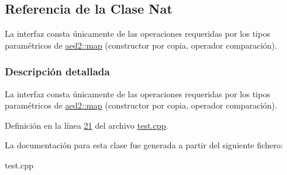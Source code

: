 \hypertarget{classNat}{\subsection{Referencia de la Clase Nat}
\label{classNat}
}


La interfaz consta únicamente de las operaciones requeridas por los tipos paramétricos de \hyperlink{classaed2_1_1map}{aed2\-::map} (constructor por copia, operador comparación).  




\subsubsection{Descripción detallada}
La interfaz consta únicamente de las operaciones requeridas por los tipos paramétricos de \hyperlink{classaed2_1_1map}{aed2\-::map} (constructor por copia, operador comparación). 

Definición en la línea \hyperlink{test_8cpp_source_l00021}{21} del archivo \hyperlink{test_8cpp_source}{test.\-cpp}.



La documentación para esta clase fue generada a partir del siguiente fichero\-:\begin{DoxyCompactItemize}
\item 
test.\-cpp\end{DoxyCompactItemize}
